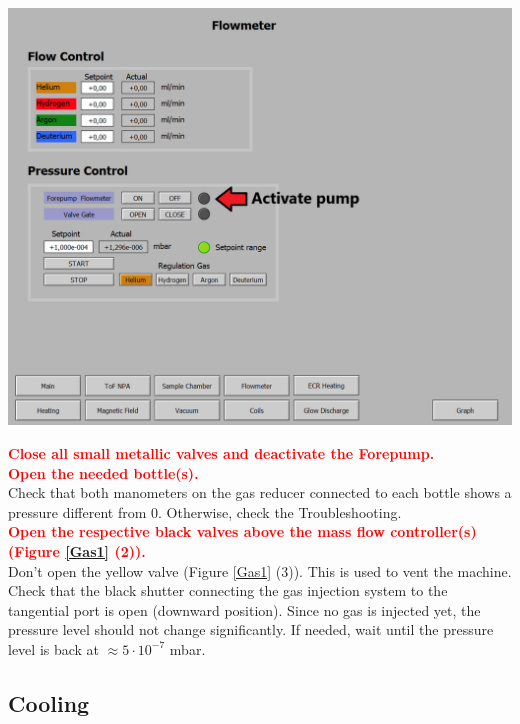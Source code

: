 \documentclass[fleqn,a4paper,20pt]{article}
\begin{document}
\begin{minipage}{.68\textwidth}
	\centering
	\includegraphics[width=0.95\linewidth]{Gas2}
	\label{Gas2}
 
\end{minipage}	
	
\newpage
\textcolor{red}{\textbf{Close all small metallic valves and deactivate the Forepump.}}\\
		
\textcolor{red}{\textbf{Open the needed bottle(s).}}\\

Check that both manometers on the gas reducer connected to each bottle shows a pressure different from 0. Otherwise, check the Troubleshooting.\\

\textcolor{red}{\textbf{Open the respective black valves above the mass flow controller(s) (Figure \ref{Gas1} (2)).}}\\


Don’t open the yellow valve (Figure \ref{Gas1} (3)). This is used to vent the machine. Check that the black shutter connecting the gas injection system to the tangential port is open (downward position). Since no gas is injected yet, the pressure level should not change significantly. If needed, wait until the pressure level is back at  $\approx 5\cdot 10^{-7}$ mbar. 

		
	
\newpage
\subsection{Cooling}
\end{document}
